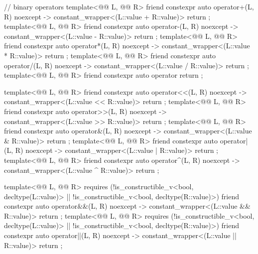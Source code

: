 \begin{codeblock}
{{    // binary operators
    template<@@ L, @@ R>
      friend constexpr auto operator+(L, R) noexcept -> constant_wrapper<(L::value + R::value)>
        { return {}; }
    template<@@ L, @@ R>
      friend constexpr auto operator-(L, R) noexcept -> constant_wrapper<(L::value - R::value)>
        { return {}; }
    template<@@ L, @@ R>
      friend constexpr auto operator*(L, R) noexcept -> constant_wrapper<(L::value * R::value)>
        { return {}; }
    template<@@ L, @@ R>
      friend constexpr auto operator/(L, R) noexcept -> constant_wrapper<(L::value / R::value)>
        { return {}; }
    template<@@ L, @@ R>
      friend constexpr auto operator%
        { return {}; }

    template<@@ L, @@ R>
      friend constexpr auto operator<<(L, R) noexcept -> constant_wrapper<(L::value << R::value)>
        { return {}; }
    template<@@ L, @@ R>
      friend constexpr auto operator>>(L, R) noexcept -> constant_wrapper<(L::value >> R::value)>
        { return {}; }
    template<@@ L, @@ R>
      friend constexpr auto operator&(L, R) noexcept -> constant_wrapper<(L::value & R::value)>
        { return {}; }
    template<@@ L, @@ R>
      friend constexpr auto operator|(L, R) noexcept -> constant_wrapper<(L::value | R::value)>
        { return {}; }
    template<@@ L, @@ R>
      friend constexpr auto operator^(L, R) noexcept -> constant_wrapper<(L::value ^ R::value)>
        { return {}; }

    template<@@ L, @@ R>
      requires (!is_constructible_v<bool, decltype(L::value)> ||
                !is_constructible_v<bool, decltype(R::value)>)
        friend constexpr auto operator&&(L, R) noexcept
          -> constant_wrapper<(L::value && R::value)>
            { return {}; }
    template<@@ L, @@ R>
      requires (!is_constructible_v<bool, decltype(L::value)> ||
                !is_constructible_v<bool, decltype(R::value)>)
        friend constexpr auto operator||(L, R) noexcept
          -> constant_wrapper<(L::value || R::value)>
            { return {}; }

}}
\end{codeblock}

